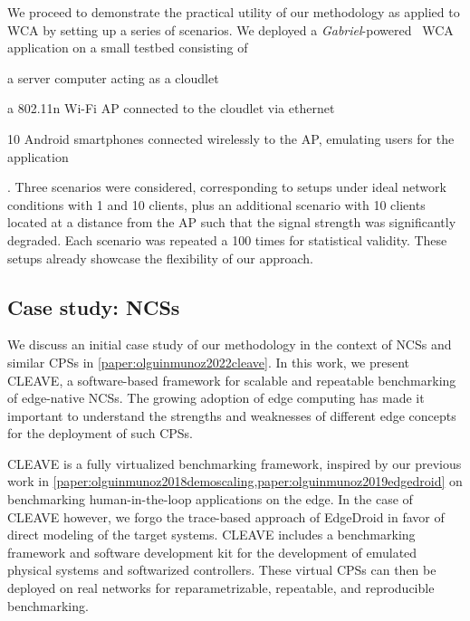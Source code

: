 \medskip
We proceed to demonstrate the practical utility of our methodology as applied to \gls{WCA} by setting up a series of scenarios.
We deployed a \emph{Gabriel}-powered~\cite{chen2018application} \gls{WCA} application on a small testbed consisting of
\begin{inlineenum}
    \item a server computer acting as a cloudlet
    \item a 802.11n Wi-Fi \gls{AP} connected to the cloudlet via ethernet
    \item \num{10} Android smartphones connected wirelessly to the \gls{AP}, emulating users for the application
\end{inlineenum}.
Three scenarios were considered, corresponding to setups under ideal network conditions with \num{1} and \num{10} clients, plus an additional scenario with \num{10} clients located at a distance from the \gls{AP} such that the signal strength was significantly degraded.
Each scenario was repeated a \num{100} times for statistical validity.
These setups already showcase the flexibility of our approach.


\subsection{Case study: \acsp{NCS}}\label{summary:methodology:usecase_ncs}

We discuss an initial case study of our methodology in the context of \glspl{NCS} and similar \glspl{CPS} in \cref{paper:olguinmunoz2022cleave}.
In this work, we present \gls{CLEAVE}, a software-based framework for scalable and repeatable benchmarking of edge-native \aclp{NCS}.
The growing adoption of edge computing has made it important to understand the strengths and weaknesses of different edge concepts for the deployment of such \glspl{CPS}.

\gls{CLEAVE} is a fully virtualized benchmarking framework, inspired by our previous work in \cref{paper:olguinmunoz2018demoscaling,paper:olguinmunoz2019edgedroid} on benchmarking human-in-the-loop applications on the edge.
In the case of \gls{CLEAVE} however, we forgo the trace-based approach of EdgeDroid in favor of direct modeling of the target systems.
\gls{CLEAVE} includes a benchmarking framework and software development kit for the development of emulated physical systems and softwarized controllers.
These virtual \glspl{CPS} can then be deployed on real networks for reparametrizable, repeatable, and reproducible benchmarking.

